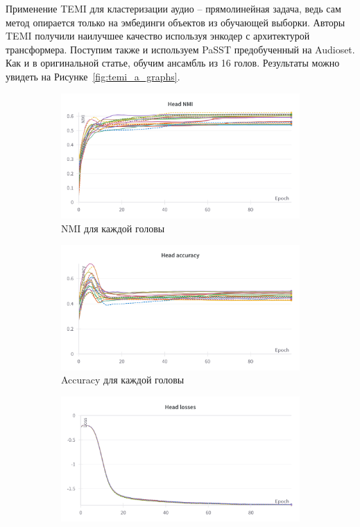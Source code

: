 \documentclass[a4paper,12pt]{extarticle}
\begin{document}
    Применение TEMI для кластеризации аудио -- прямолинейная 
    задача, ведь сам метод опирается только на эмбединги 
    объектов из обучающей выборки. Авторы TEMI получили наилучшее 
    качество используя энкодер с архитектурой трансформера. Поступим 
    также и используем PaSST предобученный на Audioset. Как и в 
    оригинальной статье, обучим ансамбль из 16 голов.
    Результаты можно увидеть на Рисунке~\ref{fig:temi_a_graphs}.


\begin{figure}[ht]
	\centering
    \begin{subfigure}{.5\textwidth}
    \centering
        \includegraphics[width=1.0\textwidth]{temi_head_nmi.png}
        \caption{NMI для каждой головы}
    \end{subfigure}%
    \begin{subfigure}{.5\textwidth}
    \centering
        \includegraphics[width=1.0\textwidth]{temi_head_accuracy.png}
        \caption{Accuracy для каждой головы}
    \end{subfigure}
    \begin{subfigure}{.5\textwidth}
    \centering
        \includegraphics[width=1.0\textwidth]{temi_head_losses.png}

\end{subfigure}
\end{figure}
\end{document}
